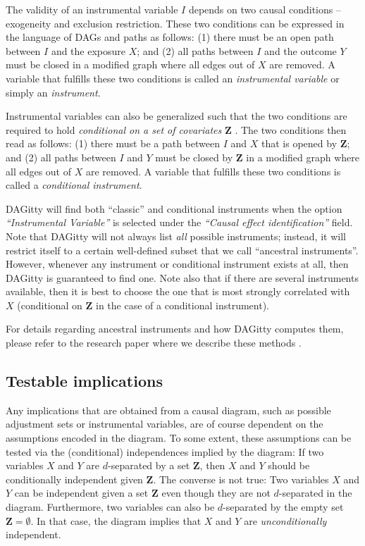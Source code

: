 \documentclass[a4paper]{article} %
\newcommand{\pp}{DAGitty\xspace}
\newcommand{\action}[1]{\emph{``#1''}}
\begin{document}
The validity of an instrumental variable $I$ depends on two causal conditions -- 
exogeneity and exclusion restriction. These two conditions can be expressed 
in the language of DAGs and paths as follows: (1) there must be an open path between 
$I$ and the exposure $X$; and (2) all paths between $I$ and the outcome $Y$ must be
closed in a modified graph where all edges out of $X$ are removed. 
A variable that fulfills these two conditions is called an \emph{instrumental variable}
or simply an \emph{instrument}.

Instrumental variables can also be generalized such that the two conditions are required
to hold \emph{conditional on a set of covariates} $\mathbf{Z}$ \cite{BritoPearlUAI02}. 
The two conditions then read as follows: 
(1) there must be a path between 
$I$ and $X$ that is opened by $\mathbf{Z}$; and (2) 
all paths between $I$ and $Y$ must be closed by $\mathbf{Z}$ 
in a modified graph where all edges out of $X$ are removed. 
A variable that fulfills these two conditions is called a
\emph{conditional instrument}.

\pp will find both ``classic'' and conditional instruments when the option 
\action{Instrumental Variable} is selected under the \action{Causal effect identification} 
field. Note that \pp will not always list \emph{all} possible instruments;
instead, it will restrict itself to a certain well-defined subset that we call 
``ancestral instruments''. However, whenever any instrument or conditional instrument
exists at all, then \pp is guaranteed to find one. Note also that if there are several
instruments available, then it is best to choose the one that is most strongly
correlated with $X$ (conditional on $\mathbf{Z}$ in the case of a conditional instrument).

For details regarding ancestral instruments and how \pp computes them, please
refer to the research paper where we describe these methods \cite{zander15_instrument}.

\subsection{Testable implications}

Any implications that are obtained from a causal diagram,
such as possible adjustment sets or instrumental variables,
are of course dependent on the 
assumptions encoded in the diagram.
To some extent, these assumptions can be tested via the 
(conditional) independences implied by the diagram: If two 
variables $X$ and $Y$ are $d$-separated by a set $\mathbf{Z}$, then
$X$ and $Y$ should be conditionally independent
given $\mathbf{Z}$. The converse is not true: Two variables
$X$ and $Y$ can be independent given a set $\mathbf{Z}$ even though they
are not $d$-separated in the diagram. Furthermore, two 
variables can also be $d$-separated by the empty set $\mathbf{Z}=\emptyset$.
In that case, the diagram implies that $X$ and $Y$ are
\emph{unconditionally} independent.
\end{document}
